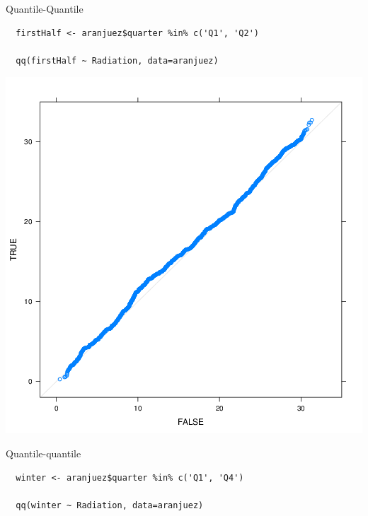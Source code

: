 \documentclass[xcolor={usenames,svgnames,dvipsnames}]{beamer}
\begin{document}
\begin{frame}[fragile,label=sec-3-50]{Quantile-Quantile}
 \lstset{language=R,label= ,caption= ,numbers=none}
\begin{lstlisting}
  firstHalf <- aranjuez$quarter %in% c('Q1', 'Q2')
  
  qq(firstHalf ~ Radiation, data=aranjuez)
\end{lstlisting}
\end{frame}

\begin{frame}[label=sec-3-51]{}
\includegraphics[width=.9\linewidth]{figs/qqHalf.png}
\end{frame}

\begin{frame}[fragile,label=sec-3-52]{Quantile-quantile}
 \lstset{language=R,label= ,caption= ,numbers=none}
\begin{lstlisting}
  winter <- aranjuez$quarter %in% c('Q1', 'Q4')
  
  qq(winter ~ Radiation, data=aranjuez)
\end{lstlisting}
\end{frame}
\end{document}
